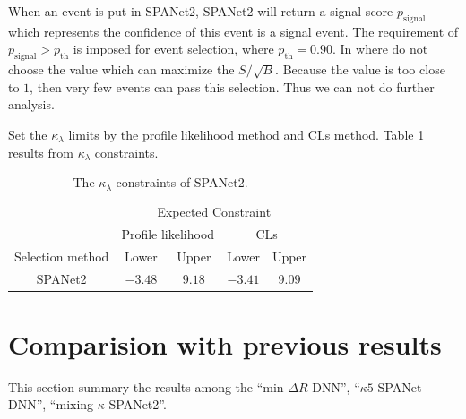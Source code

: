 \documentclass[12pt]{article}
\begin{document}
		When an event is put in SPANet2, SPANet2 will return a signal score $p_\text{signal}$ which represents the confidence of this event is a signal event. The requirement of $p_\text{signal} > p_\text{th}$ is imposed for event selection, where $p_\text{th} = 0.90$. In where do not choose the value which can maximize the $S / \sqrt{B}$. Because the value is too close to $1$, then very few events can pass this selection. Thus we can not do further analysis.  

		Set the $\kappa_\lambda$ limits by the profile likelihood method and CLs method. Table \ref{tab:kappa_constraint_SPANet} results from $\kappa_\lambda$ constraints.
		\begin{table}[htpb]
			\centering
			\caption{The $\kappa_\lambda$ constraints of SPANet2.}
			\label{tab:kappa_constraint_SPANet}
			\begin{tabular}{c|cc|cc}
								  & \multicolumn{4}{c}{Expected Constraint}                          \\
								  & \multicolumn{2}{c}{Profile likelihood} & \multicolumn{2}{c}{CLs} \\ \hline
			Selection method        & Lower              & Upper             & Lower      & Upper      \\ \hline
			SPANet2      & $-3.48$            & $9.18$             & $-3.41$      & $9.09$      \\
			\end{tabular}
		\end{table}

		
\section{Comparision with previous results}%
\label{sec:comparision_with_previous_results}
	This section summary the results among the ``$\text{min-}\Delta R$ DNN'', ``$\kappa 5$ SPANet DNN'', ``mixing $\kappa$ SPANet2''.
\end{document}
